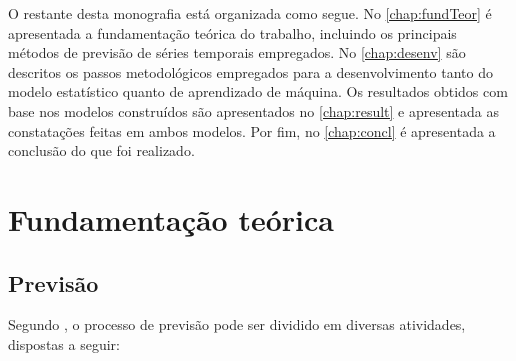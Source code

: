 \documentclass[
    12pt,
    oneside,
    a4paper,
    english,
    brazil
]{abntex2}
\begin{document}
O    restante   desta    monografia    está   organizada    como   segue.    No
\autoref{chap:fundTeor}  é apresentada  a  fundamentação  teórica do  trabalho,
incluindo os principais métodos de  previsão de séries temporais empregados. No
\autoref{chap:desenv} são  descritos os passos metodológicos  empregados para a
desenvolvimento tanto do  modelo estatístico quanto de  aprendizado de máquina.
Os  resultados obtidos  com base  nos modelos  construídos são  apresentados no
\autoref{chap:result} e  apresentada as  constatações feitas em  ambos modelos.
Por  fim,  no  \autoref{chap:concl}  é  apresentada  a  conclusão  do  que  foi
realizado.

\chapter{Fundamentação teórica}\label{chap:fundTeor}

\section{Previsão}
Segundo  ,  o  processo  de previsão  pode  ser  dividido  em
diversas atividades, dispostas a seguir:
\end{document}
